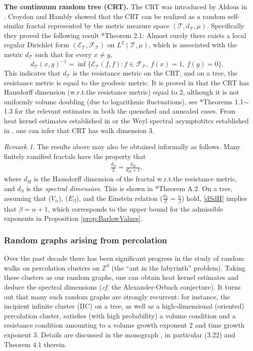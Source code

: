 \documentclass[11pt]{amsart}
\theoremstyle{plain}
\theoremstyle{definition}
\theoremstyle{remark}
\newtheorem{remark}[lemma]{Remark}
\begin{document}
\textbf{The continuum random tree (CRT).} The CRT was introduced by Aldous in \cites{AldousCRT1, AldousCRT2, AldousCRT3}. Croydon and Hambly \cite{CH08} showed that the CRT can be realized as a random self-similar fractal represented by the metric measure space $(\mathcal{T}, d_\mathcal{T}, \mu)$. Specifically they proved the following result \cite{CH08}*{Theorem 2.1}: Almost surely there exists a local regular Dirichlet form $(\mathcal{E}_\mathcal{T}, \mathcal{F}_\mathcal{T})$ on $L^2(\mathcal{T}, \mu)$, which is associated with the metric $d_\mathcal{T}$ such that for every $x\neq y$,
\[
d_{\mathcal{T}}(x,y)^{-1} = \inf\{\mathcal{E}_\mathcal{T}(f,f): f\in \mathcal{F}_\mathcal{T},~f(x)=1,~f(y)=0\}.
\] 
This indicates that $d_\mathcal{T}$ is the resistance metric on the CRT, and on a tree, the resistance metric is equal to the geodesic metric. It is proved in \cite{DuquesneLeGall} that the  CRT has Hausdorff dimension (w.r.t.\@ the resistance metric) equal to $2$, although it is not uniformly volume doubling (due to logarithmic fluctuations), see \cite{Croydon08}*{Theorems 1.1$\sim$1.3} for the relevant estimates in both the quenched and annealed cases. From heat kernel estimates established in \cite{Croydon08} or the Weyl spectral asymptotitcs established in \cite{CH08}, one can infer that CRT has walk dimension $3$.

\begin{remark}
The results above may also be obtained informally as follows. Many finitely ramified fractals have the property that
\begin{align}
\label{dSdH}
\frac{d_S}{2} = \frac{d_H}{d_H+1},
\end{align}
where $d_H$ is the Hausdorff dimension of the fractal w.r.t.\@ the resistance metric, and $d_S$ is the \emph{spectral dimension}. This is shown in \cite{KigamiLapidus}*{Theorem A.2}. On a tree, assuming that ($V_\alpha$), ($E_\beta$), and the Einstein relation ($\frac{d_S}{2} = \frac{\alpha}{\beta}$) hold, \eqref{dSdH} implies that $\beta=\alpha+1$, which corresponds to the upper bound for the admissible exponents in Proposition \ref{prop:BarlowValues}.
\end{remark}

\subsubsection{Random graphs arising from percolation}

Over the past decade there has been significant progress in the study of random walks on percolation clusters on $\mathbb{Z}^d$ (the ``ant in the labyrinth'' problem). Taking these clusters as our random graphs, one can obtain heat kernel estimates and deduce the spectral dimensions (\emph{cf.\@} the Alexander-Orbach conjecture). It turns out that many such random graphs are strongly recurrent: for instance, the incipient infinite cluster (IIC) on a tree, as well as a high-dimensional (oriented) percolation cluster, satisfies (with high probability) a volume condition and a resistance condition amounting to a volume growth exponent $2$ and time growth exponent $3$. Details are discussed in the monograph \cite{KumagaiStFlour}, in particular (3.22) and Theorem 4.1 therein.  
\end{document}
